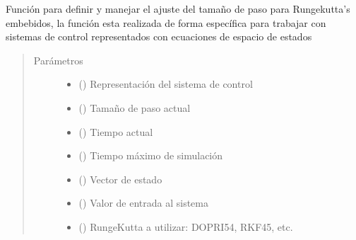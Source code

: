 \documentclass[letterpaper,10pt,spanish]{sphinxmanual}
\begin{document}
\begin{fulllineitems}
\label{\detokenize{codigos/rutinas_rk:rutinas_rk.rk_embebido_adaptativo}}
Función para definir y manejar el ajuste del tamaño de paso para Runge\sphinxhyphen{}kutta’s embebidos, la función esta realizada de forma específica para trabajar con sistemas de control representados con ecuaciones de espacio de estados
\begin{quote}\begin{description}
\item[{Parámetros}] \leavevmode\begin{itemize}
\item {} 
 () \textendash{} Representación del sistema de control

\item {} 
 () \textendash{} Tamaño de paso actual

\item {} 
 () \textendash{} Tiempo actual

\item {} 
 () \textendash{} Tiempo máximo de simulación

\item {} 
 () \textendash{} Vector de estado

\item {} 
 () \textendash{} Valor de entrada al sistema

\item {} 
 () \textendash{} Runge\sphinxhyphen{}Kutta a utilizar: DOPRI54, RKF45, etc.


\end{itemize}
\end{description}
\end{quote}
\end{fulllineitems}
\end{document}
